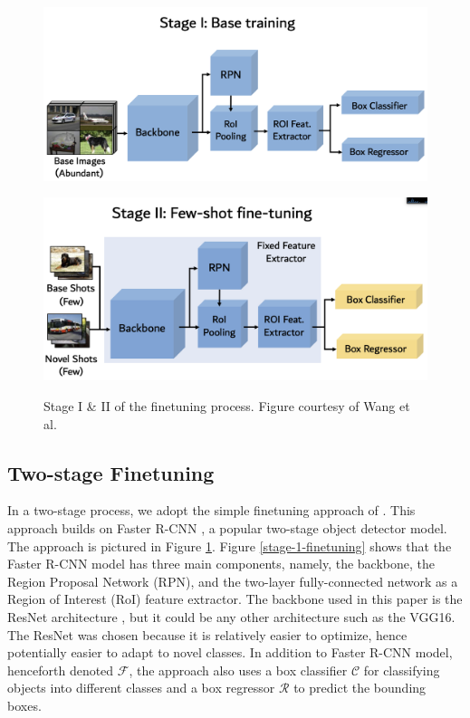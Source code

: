 \documentclass{article}
\begin{document}
\begin{figure}[h]
  \begin{minipage}{0.47\textwidth}
  \includegraphics[width=\textwidth, height=0.17\textheight]{./../../figures/fs_det/s1_finetuning.png}
  \label{stage-1-finetuning}
  \end{minipage}
  \begin{minipage}{0.47\textwidth}
  \includegraphics[width=\textwidth, height=0.17\textheight]{./../../figures/fs_det/s2_finetuning.png}
  \label{stage-2-finetuning}
  \end{minipage}
  \caption{Stage I \& II of  the finetuning process. Figure courtesy of Wang et al. }
  \label{finetuning}
\end{figure}

\subsection{Two-stage Finetuning} \label{two-stage-finetuning}
In a two-stage process, we adopt the simple finetuning approach of \cite{wang2020frustratingly}. 
This approach builds on Faster R-CNN \cite{ren2015faster}, a popular two-stage object detector model. 
The approach is pictured in Figure \ref{finetuning}.  
Figure \ref{stage-1-finetuning} shows that the Faster R-CNN model has three main components, namely, 
the backbone, the Region Proposal Network (RPN), and the two-layer fully-connected network as a 
Region of Interest (RoI) feature extractor.  
The backbone used in this paper is the ResNet architecture \cite{he2016deep}, but it could be any other 
architecture such as the VGG16. The ResNet was chosen because it is relatively easier to optimize,
hence potentially easier to adapt to novel classes. 
In addition to Faster R-CNN model, henceforth denoted $\mathcal{F}$, the approach also uses a box 
classifier $\mathcal{C}$ for classifying objects into different classes and a box regressor $\mathcal{R}$
to predict the bounding boxes. 
\end{document}
